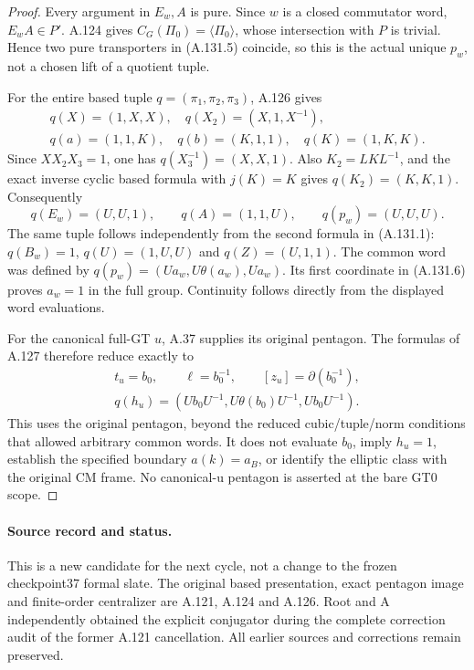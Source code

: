 \begin{proof}
Every argument in \(E_w,A\) is pure. Since \(w\) is a closed
commutator word, \(E_wA\in P'\). A.124 gives
\(C_G(\Pi_0)=\langle\Pi_0\rangle\), whose intersection with
\(P\) is trivial. Hence two pure transporters in (A.131.5)
coincide, so this is the actual unique \(p_w\), not a chosen
lift of a quotient tuple.

For the entire based tuple \(q=(\pi_1,\pi_2,\pi_3)\), A.126 gives
\[
\begin{gathered}
 q(X)=(1,X,X),\quad q(X_2)=(X,1,X^{-1}),\\
 q(a)=(1,1,K),\quad q(b)=(K,1,1),\quad q(K)=(1,K,K).
\end{gathered}
\]
Since \(XX_2X_3=1\), one has \(q(X_3^{-1})=(X,X,1)\).
Also \(K_2=LKL^{-1}\), and the exact inverse cyclic based
formula with \(j(K)=K\) gives \(q(K_2)=(K,K,1)\).
Consequently
\[
 q(E_w)=(U,U,1),\qquad q(A)=(1,1,U),\qquad
 q(p_w)=(U,U,U).                                     \tag{A.131.6}
\]
The same tuple follows independently from the second formula in
(A.131.1): \(q(B_w)=1\), \(q(U)=(1,U,U)\) and
\(q(Z)=(U,1,1)\). The common word was defined by
\(q(p_w)=(Ua_w,U\theta(a_w),Ua_w)\). Its first coordinate
in (A.131.6) proves \(a_w=1\) in the full group.
Continuity follows directly from the displayed word evaluations.

For the canonical full-GT \(u\), A.37 supplies its original
pentagon. The formulas of A.127 therefore reduce exactly to
\[
\begin{gathered}
 t_u=b_0,\qquad \ell=b_0^{-1},\qquad
 [z_u]=\partial(b_0^{-1}),\\
 q(h_u)=(Ub_0U^{-1},U\theta(b_0)U^{-1},Ub_0U^{-1}).
\end{gathered}
\]
This uses the original pentagon, beyond the reduced cubic/tuple/norm
conditions that allowed arbitrary common words. It does not evaluate
\(b_0\), imply \(h_u=1\), establish the specified boundary
\(a(k)=a_B\), or identify the elliptic class with the original
CM frame. No canonical-u pentagon is asserted at the bare GT0 scope.
\end{proof}

\paragraph{Source record and status.}
This is a new candidate for the next cycle, not a change to the frozen
checkpoint37 formal slate. The original based presentation, exact
pentagon image and finite-order centralizer are A.121, A.124 and A.126.
Root and A independently obtained the explicit conjugator during the
complete correction audit of the former A.121 cancellation.
All earlier sources and corrections remain preserved.
